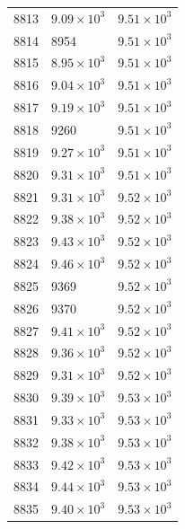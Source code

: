\begin{table}[H]
\begin{tabular}{lll}
8813 & $\displaystyle 9.09 \times 10^{3}$ & $\displaystyle 9.51 \times 10^{3}$ \\
8814 & 8954 & $\displaystyle 9.51 \times 10^{3}$ \\
8815 & $\displaystyle 8.95 \times 10^{3}$ & $\displaystyle 9.51 \times 10^{3}$ \\
8816 & $\displaystyle 9.04 \times 10^{3}$ & $\displaystyle 9.51 \times 10^{3}$ \\
8817 & $\displaystyle 9.19 \times 10^{3}$ & $\displaystyle 9.51 \times 10^{3}$ \\
8818 & 9260 & $\displaystyle 9.51 \times 10^{3}$ \\
8819 & $\displaystyle 9.27 \times 10^{3}$ & $\displaystyle 9.51 \times 10^{3}$ \\
8820 & $\displaystyle 9.31 \times 10^{3}$ & $\displaystyle 9.51 \times 10^{3}$ \\
8821 & $\displaystyle 9.31 \times 10^{3}$ & $\displaystyle 9.52 \times 10^{3}$ \\
8822 & $\displaystyle 9.38 \times 10^{3}$ & $\displaystyle 9.52 \times 10^{3}$ \\
8823 & $\displaystyle 9.43 \times 10^{3}$ & $\displaystyle 9.52 \times 10^{3}$ \\
8824 & $\displaystyle 9.46 \times 10^{3}$ & $\displaystyle 9.52 \times 10^{3}$ \\
8825 & 9369 & $\displaystyle 9.52 \times 10^{3}$ \\
8826 & 9370 & $\displaystyle 9.52 \times 10^{3}$ \\
8827 & $\displaystyle 9.41 \times 10^{3}$ & $\displaystyle 9.52 \times 10^{3}$ \\
8828 & $\displaystyle 9.36 \times 10^{3}$ & $\displaystyle 9.52 \times 10^{3}$ \\
8829 & $\displaystyle 9.31 \times 10^{3}$ & $\displaystyle 9.52 \times 10^{3}$ \\
8830 & $\displaystyle 9.39 \times 10^{3}$ & $\displaystyle 9.53 \times 10^{3}$ \\
8831 & $\displaystyle 9.33 \times 10^{3}$ & $\displaystyle 9.53 \times 10^{3}$ \\
8832 & $\displaystyle 9.38 \times 10^{3}$ & $\displaystyle 9.53 \times 10^{3}$ \\
8833 & $\displaystyle 9.42 \times 10^{3}$ & $\displaystyle 9.53 \times 10^{3}$ \\
8834 & $\displaystyle 9.44 \times 10^{3}$ & $\displaystyle 9.53 \times 10^{3}$ \\
8835 & $\displaystyle 9.40 \times 10^{3}$ & $\displaystyle 9.53 \times 10^{3}$ \\

\end{tabular}
\end{table}

